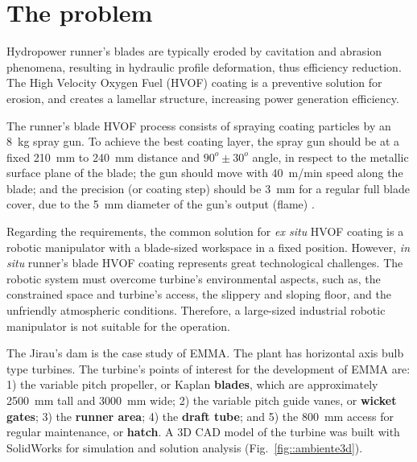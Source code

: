 \section{The problem}\label{problem}



Hydropower runner's blades are typically eroded by cavitation and abrasion
phenomena, resulting in hydraulic profile deformation, thus efficiency
reduction. The High Velocity Oxygen Fuel (HVOF) coating is a preventive
solution for erosion, and creates a lamellar structure, increasing
power generation efficiency. 

The runner's blade HVOF process consists of spraying coating particles
by an 8~kg spray gun. To achieve the best coating layer, the spray gun should be at a
fixed 210~mm to 240~mm distance and $90^o \pm 30^o$ angle, in respect
to the metallic surface plane of the blade; the gun should move with 40~m/min
speed along the blade; and the precision (or coating step) should be 3~mm for a
regular full blade cover, due to the 5~mm diameter of the gun's output (flame)
\cite{li2002effect}.

Regarding the requirements, the common solution for \textit{ex situ} HVOF
coating is a robotic manipulator with a blade-sized workspace in a fixed
position. However, \textit{in situ} runner's blade HVOF coating represents
great technological challenges. The robotic system must overcome
turbine's environmental aspects, such as, the constrained space and turbine's
access, the slippery and sloping floor, and the unfriendly atmospheric
conditions. Therefore, a large-sized industrial robotic manipulator is not
suitable for the operation.

The Jirau's dam is the case study of EMMA. The plant has horizontal
axis bulb type turbines. The turbine's points of interest for the
development of EMMA are: 1) the variable pitch propeller, or Kaplan
\textbf{blades}, which are approximately 2500~mm tall and 3000~mm wide; 2) the
variable pitch guide vanes, or \textbf{wicket gates}; 3) the \textbf{runner
area}; 4) the \textbf{draft tube}; and 5) the 800~mm access for regular
maintenance, or \textbf{hatch}. A 3D CAD model of the turbine was built with
SolidWorks\raisebox{1ex}{\textregistered} for simulation and solution analysis
(Fig.~\ref{fig::ambiente3d}). 
 
